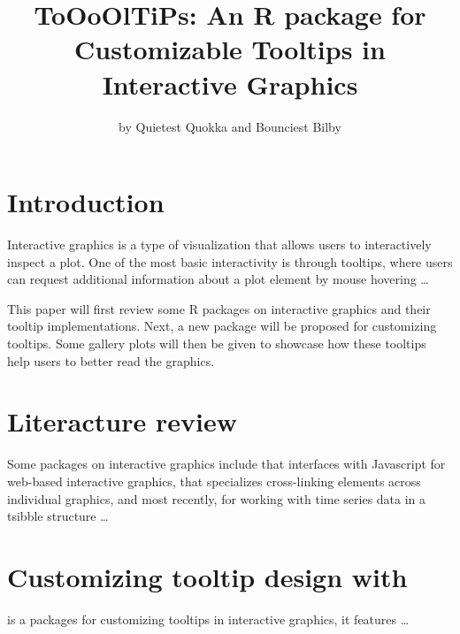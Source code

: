 \title{ToOoOlTiPs: An R package for Customizable Tooltips in Interactive
Graphics}
\author{by Quietest Quokka and Bounciest Bilby}

\maketitle


\hypertarget{introduction}{%
\section{Introduction}\label{introduction}}

Interactive graphics is a type of visualization that allows users to
interactively inspect a plot. One of the most basic interactivity is
through tooltips, where users can request additional information about a
plot element by mouse hovering \ldots{}

This paper will first review some R packages on interactive graphics and
their tooltip implementations. Next, a new package 
will be proposed for customizing tooltips. Some gallery plots will then
be given to showcase how these tooltips help users to better read the
graphics.

\hypertarget{literacture-review}{%
\section{Literacture review}\label{literacture-review}}

Some packages on interactive graphics include 
\citep{plotly} that interfaces with Javascript for web-based interactive
graphics,  \citep{crosstalk} that specializes
cross-linking elements across individual graphics, and most recently,
 \citep{RJ-2021-050} for working with time series
data in a tsibble structure \ldots{}

\hypertarget{customizing-tooltip-design-with}{%
\section{\texorpdfstring{Customizing tooltip design with
}{Customizing tooltip design with }}\label{customizing-tooltip-design-with}}

 is a packages for customizing tooltips in interactive
graphics, it features \ldots{}

